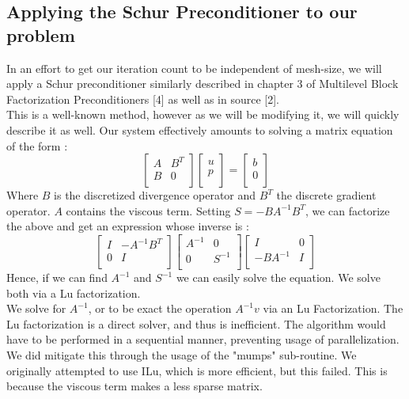 \documentclass[11pt,twoside,a4paper]{article}
\begin{document}
\subsection{Applying the Schur Preconditioner to our problem}
In an effort to get our iteration count to be independent of mesh-size, we will apply a Schur preconditioner similarly described in chapter 3 of Multilevel Block Factorization Preconditioners [4] as well as in source [2].\\
This is a well-known method, however as we will be modifying it, we will quickly describe it as well.
Our system effectively amounts to solving a matrix equation of the form :
$$
\begin{bmatrix}
A         & B^{T}\\
B         & 0 \\
\end{bmatrix}
\begin{bmatrix}
u    \\
p     \\
\end{bmatrix}
=
\begin{bmatrix}
b    \\
0     \\
\end{bmatrix}
$$
Where $B$ is the discretized divergence operator and $B^T$ the discrete gradient operator. $A$ contains the viscous term.
Setting $S = - B A^{-1} B^{T}$, we can factorize the above and get an expression whose inverse is :
$$
\begin{bmatrix}
I         & - A^{-1} B^{T}\\
0         & I \\
\end{bmatrix}
\begin{bmatrix}
A^{-1}   & 0\\
0       & S^{-1} \\
\end{bmatrix}
\begin{bmatrix}
I & 0\\
 - B A^{-1}       & I \\
\end{bmatrix}
$$
Hence, if we can find $A^{-1}$ and $S^{-1}$ we can easily solve the equation. We solve both via a Lu factorization.\\
We solve for $A^{-1}$, or to be exact the operation $A^{-1}v$ via an Lu Factorization. The Lu factorization is a direct solver, and thus is inefficient. The algorithm would have to be performed in a sequential manner, preventing usage of parallelization. We did mitigate this through the usage of the "mumps" sub-routine. We originally attempted to use ILu, which is more efficient, but this failed. This is because the viscous term makes a less sparse matrix.\\
\end{document}
